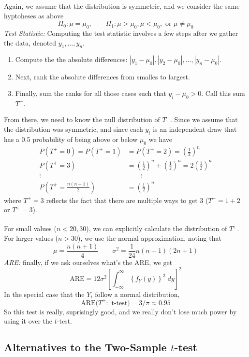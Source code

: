 \documentclass[a4paper,12pt]{scrartcl}
\begin{document}
Again, we assume that the distribution is symmetric, and we consider
the same hyptoheses as above
\[ H_0: \mu = \mu_0, \qquad H_1: \mu>\mu_0, \mu<\mu_0, \text{ or }
      \mu\neq\mu_0\]
{\sl Test Statistic:} Computing the test statistic involves a few steps
after we gather the data, denoted $y_1, \ldots, y_n$.
\begin{enumerate}
   \item Compute the the absolute differences:
      $|y_1 - \mu_0|, |y_2 - \mu_0|, \ldots, |y_n - \mu_0|$.
   \item Next, rank the absolute differences from smalles to largest.
   \item Finally, sum the ranks for all those cases such that
      $y_i - \mu_0 >0$. Call this sum $T^+$.
\end{enumerate}
From there, we need to know the null distribution of $T^+$. Since we
assume that the distribution was symmetric, and since each
$y_i$ is an independent draw that has a 0.5 probability of being
above or below $\mu_0$ we have
\begin{align*}
   P(T^+ = 0) = P(T^+ = 1) &= P(T^+ = 2)=\left(\frac{1}{2}\right)^n \\
   P(T^+ = 3) &= \left(\frac{1}{2}\right)^n
      + \left(\frac{1}{2}\right)^n = 2\left(\frac{1}{2}\right)^n\\
   \vdots \qquad & \qquad \vdots \\
   P\left(T^+ = \frac{n(n+1)}{2}\right) &= \left(\frac{1}{2}\right)^n
\end{align*}
where $T^+ = 3$ reflects the fact that there are multiple ways
to get 3 ($T^+ = 1 + 2$ or $T^+ = 3$).
\\
\\
For small values ($n<20,30$), we can explicitly calculate the
distribution of $T^+$. For larger values ($n>30$), we use the
normal approximation, noting that
   \[ \mu = \frac{n(n+1)}{4}\qquad \sigma^2 = \frac{1}{24}n(n+1)(2n+1)
      \]
{\sl ARE:} finally, if we ask ourselves what's the ARE, we get
\[ \text{ARE} = 12 \sigma^2 \left[ \int^\infty_{-\infty} \left\{
   f_Y(y)\right\}^2 \; dy \right]^2\]
In the special case that the $Y_i$ follow a normal distribution,
   \[ \text{ARE($T^+:$ t-test)} = 3/\pi \approx 0.95\]
So this test is really, suprisingly good, and we really don't lose
much power by using it over the $t$-test.

\newpage
\subsection{Alternatives to the Two-Sample $t$-test}
\end{document}
